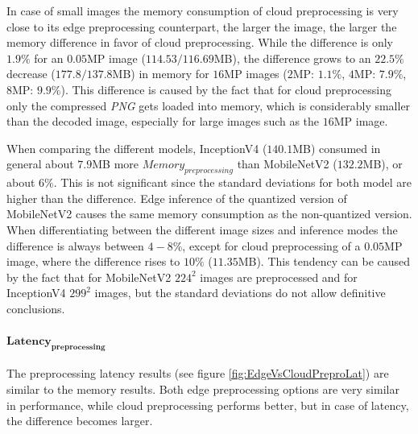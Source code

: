 In case of small images the memory consumption of cloud preprocessing is very close to its edge preprocessing counterpart, the larger the image, the larger the memory difference in favor of cloud preprocessing.
While the difference is only $1.9\%$ for an $0.05$MP image ($114.53/116.69$MB), the difference grows to an $22.5\%$ decrease ($177.8/137.8$MB) in memory for $16$MP images ($2$MP: $1.1\%$, $4$MP: $7.9\%$, $8$MP: $9.9\%$).
This difference is caused by the fact that for cloud preprocessing only the compressed \emph{PNG} gets loaded into memory, which is considerably smaller than the decoded image, especially for large images such as the $16$MP image.

When comparing the different models, InceptionV4 ($140.1$MB) consumed in general about $7.9$MB more $Memory_{preprocessing}$ than MobileNetV2 ($132.2$MB), or about $6\%$. This is not significant since the standard deviations for both model are higher than the difference.
Edge inference of the quantized version of MobileNetV2 causes the same memory consumption as the non-quantized version.
When differentiating between the different image sizes and inference modes the difference is always between $4-8\%$, except for cloud preprocessing of a $0.05$MP image, where the difference rises to $10\%$ ($11.35$MB). This tendency can be caused by the fact that for MobileNetV2 $224^2$ images are preprocessed and for InceptionV4 $299^2$ images, but the standard deviations do not allow definitive conclusions.

\paragraph{$\mathbf{Latency_{preprocessing}}$}
The preprocessing latency results (see figure \ref{fig:EdgeVsCloudPreproLat}) are similar to the memory results. Both edge preprocessing options are very similar in performance, while cloud preprocessing performs better, but in case of latency, the difference becomes larger.

